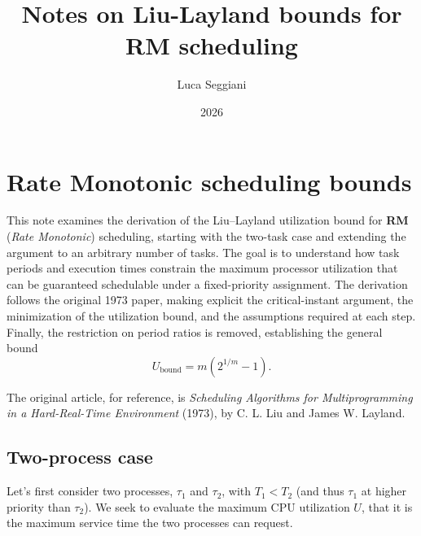 \documentclass[a4paper,11pt]{article}
\title{Notes on Liu-Layland bounds for RM scheduling}
\author{Luca Seggiani}
\date{2026}
\makeatletter
\renewcommand{\maketitle} {
	\begin{center} 
		\begin{minipage}[t]{.8\textwidth}
			\textsf{\huge\bfseries \@title} 
		\end{minipage}%
		\begin{minipage}[t]{.2\textwidth}
			\raggedleft \vspace{-1.65em}
			\textsf{\small \@author} \vfill
			\textsf{\small \@date}
		\end{minipage}
		\par
	\end{center}

	\thispagestyle{empty}
	\pagestyle{fancy}
}
\makeatother
\begin{document}
\pagestyle{fancy}
\thispagestyle{empty}
\renewcommand{\thispagestyle}[1]{}

\maketitle

\section{Rate Monotonic scheduling bounds}

This note examines the derivation of the Liu–Layland utilization bound for \textbf{RM} (\textit{Rate Monotonic}) scheduling, starting with the two-task case and extending the argument to an arbitrary number of tasks. The goal is to understand how task periods and execution times constrain the maximum processor utilization that can be guaranteed schedulable under a fixed-priority assignment. The derivation follows the original 1973 paper, making explicit the critical-instant argument, the minimization of the utilization bound, and the assumptions required at each step. Finally, the restriction on period ratios is removed, establishing the general bound
\[
	U_{\mathrm{bound}}=m\left(2^{1/m}-1\right).
\]

The original article, for reference, is \textit{Scheduling Algorithms for Multiprogramming in a Hard-Real-Time Environment} (1973), by C. L. Liu and James W. Layland.

\subsection{Two-process case}

Let's first consider two processes, $\tau_1$ and $\tau_2$, with $T_1 < T_2$ (and thus $\tau_1$ at higher priority than $\tau_2$).
We seek to evaluate the maximum CPU utilization $U$, that it is the maximum service time the two processes can request.
\end{document}
